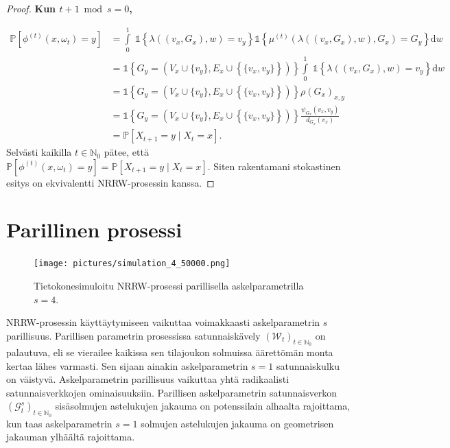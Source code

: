 \documentclass[finnish, 12pt, a4paper, sci, utf8, pdfa]{aaltothesis}
\newcommand{\N}{\mathbb{N}}
\newcommand{\Grandom}{\mathcal{G}}
\newcommand{\Wrandom}{\mathcal{W}}
\newcommand{\indicator}{\mathopen{\mathds{1}}}
\newcommand*{\prob}{\mathbb{P}}
\begin{document}
\begin{proof}
{\textbf{Kun $ t + 1 \bmod s = 0 $,}

\begin{align*}
   \prob \left[ \phi^{(t)}(x, \omega_{t}) = y \right] &= \int\limits_0^1 \; \indicator \left\{ \lambda\left( (v_{x}, G_{x}), w \right) = v_{y} \right\} \indicator \left\{ \mu^{(t)} \left( \lambda\left( (v_{x}, G_{x}), w \right), G_{x} \right) = G_{y} \right\} \mathrm{d}w \\
                                                &= \indicator \left\{ G_{y} = (V_{x} \cup \{ v_{y} \}, E_{x} \cup \left\{ \{ v_{x}, v_{y} \} \right\}) \right\} \int\limits_0^1 \; \indicator \left\{ \lambda\left( (v_{x}, G_{x}), w \right) = v_{y} \right\}  \mathrm{d}w \\
                                                &= \indicator \left\{ G_{y} = (V_{x} \cup \{ v_{y} \}, E_{x} \cup \left\{ \{ v_{x}, v_{y} \} \right\}) \right\} \rho(G_{x})_{x,y} \\
                                                &= \indicator \left\{ G_{y} = (V_{x} \cup \{ v_{y} \}, E_{x} \cup \left\{ \{ v_{x}, v_{y} \} \right\}) \right\} \frac{\psi_{G_{x}}(v_{x}, v_{y})}{d_{G_{x}}(v_{x})} \\
                                                &= \prob \left[ X_{t+1} = y \mid X_{t} = x \right].
\end{align*}
Selvästi kaikilla $ t \in \N_{0} $ pätee, että $ \prob \left[ \phi^{(t)}(x, \omega_{t}) = y \right] = \prob \left[ X_{t+1} = y \mid X_{t} = x \right] $. Siten rakentamani stokastinen esitys on ekvivalentti NRRW-prosessin kanssa.
}

\end{proof}

\section{Parillinen prosessi}

\begin{figure}[htb]
\centering
\texttt{[image: pictures/simulation\_4\_50000.png]}
   \caption{Tietokonesimuloitu NRRW-prosessi parillisella askelparametrilla $ s = 4 $. \label{figure:oma_simulaatio}}
\end{figure}

NRRW-prosessin käyttäytymiseen vaikuttaa voimakkaasti askelparametrin $ s $ parillisuus. Parillisen parametrin prosessissa satunnaiskävely $ (\Wrandom_{t})_{t \in \N_{0}} $ on palautuva, eli se vierailee kaikissa sen tilajoukon solmuissa äärettömän monta kertaa lähes varmasti. Sen sijaan ainakin askelparametrin $ s = 1 $ satunnaiskulku on väistyvä. Askelparametrin parillisuus vaikuttaa yhtä radikaalisti satunnaisverkkojen ominaisuuksiin. Parillisen askelparametrin satunnaisverkon $ (\Grandom^{s}_{t})_{t \in \N_{0}} $ sisäsolmujen astelukujen jakauma on potenssilain alhaalta rajoittama, kun taas askelparametrin $ s = 1 $ solmujen astelukujen jakauma on geometrisen jakauman ylhäältä rajoittama.
\end{document}
